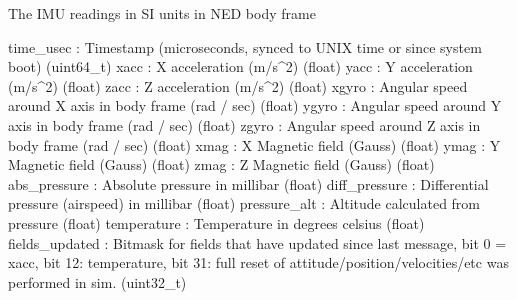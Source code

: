 \begin{DoxyVerb}
\begin{DoxyVerb}
\begin{DoxyVerb}
\begin{DoxyVerb}
\begin{DoxyVerb}The IMU readings in SI units in NED body frame

time_usec                 : Timestamp (microseconds, synced to UNIX time or since system boot) (uint64_t)
xacc                      : X acceleration (m/s^2) (float)
yacc                      : Y acceleration (m/s^2) (float)
zacc                      : Z acceleration (m/s^2) (float)
xgyro                     : Angular speed around X axis in body frame (rad / sec) (float)
ygyro                     : Angular speed around Y axis in body frame (rad / sec) (float)
zgyro                     : Angular speed around Z axis in body frame (rad / sec) (float)
xmag                      : X Magnetic field (Gauss) (float)
ymag                      : Y Magnetic field (Gauss) (float)
zmag                      : Z Magnetic field (Gauss) (float)
abs_pressure              : Absolute pressure in millibar (float)
diff_pressure             : Differential pressure (airspeed) in millibar (float)
pressure_alt              : Altitude calculated from pressure (float)
temperature               : Temperature in degrees celsius (float)
fields_updated            : Bitmask for fields that have updated since last message, bit 0 = xacc, bit 12: temperature, bit 31: full reset of attitude/position/velocities/etc was performed in sim. (uint32_t)\end{DoxyVerb}
 \mbox{\label{classpymavlink_1_1dialects_1_1v10_1_1MAVLink_a1db1e2a0b8e2df32080de910479b1654}} 

\end{DoxyVerb}
\end{DoxyVerb}
\end{DoxyVerb}
\end{DoxyVerb}
